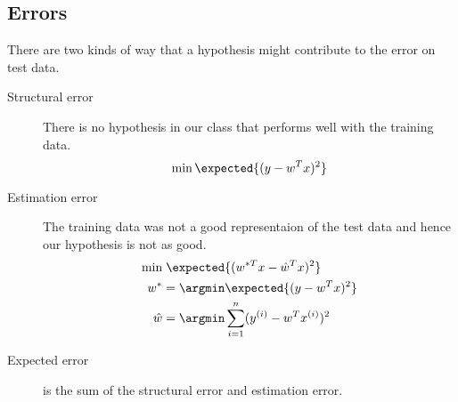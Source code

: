 \subsection{Errors}
There are two kinds of way that a hypothesis might contribute to the error on test data.
\begin{description}
    \item [Structural error] There is no hypothesis in our class that performs well with the training data.
    \begin{equation*}
        \min \expected{(y - w^Tx)^2}
    \end{equation*}
    \item [Estimation error] The training data was not a good representaion of the test data and hence our hypothesis is not as good.
    \begin{align*}
        \min &\; \expected{(w^{\ast T} x - \hat{w}^T x)^2}\\
        w^\ast &= \argmin \expected{(y - w^Tx)^2}\\
        \hat{w} &= \argmin \sum_{i= 1}^{n} (y^{(i)} - w^T x^{(i)})^2 
    \end{align*}
    \item [Expected error] is the sum of the structural error and estimation error.
\end{description}
